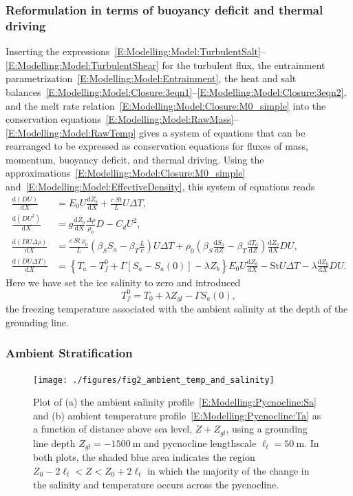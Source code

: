 \documentclass[openacc]{rsproca_new}%
\newcommand{\dd}[2]{\frac{\mathrm{d} #1}{\mathrm{d} #2}}
\begin{document}
\subsubsection{Reformulation in terms of buoyancy deficit and thermal driving}
Inserting the expressions~\eqref{E:Modelling:Model:TurbulentSalt}--\eqref{E:Modelling:Model:TurbulentShear} for the turbulent flux, the entrainment parametrization~\eqref{E:Modelling:Model:Entrainment}, the heat and salt balances~\eqref{E:Modelling:Model:Closure:3eqn1}--\eqref{E:Modelling:Model:Closure:3eqn2}, and the melt rate relation~\eqref{E:Modelling:Model:Closure:M0_simple} into the conservation equations~\eqref{E:Modelling:Model:RawMass}--\eqref{E:Modelling:Model:RawTemp} gives a system of equations that can be rearranged to be expressed as conservation equations for fluxes of mass, momentum, buoyancy deficit, and thermal driving. Using the approximations~\eqref{E:Modelling:Model:Closure:M0_simple} and~\eqref{E:Modelling:Model:EffectiveDensity}, this system of equations reads
\begin{align}
\dd{(DU)}{X} &= E_0 U \dd{Z_b}{X}+ \frac{c~\textit{St}}{L}U\Delta T,\label{E:Modelling:Model:Mass}\\
\dd{(DU^2)}{X} &= g \dd{Z_b}{X} \frac{\Delta \rho }{\rho_0} D - C_d U^2, \label{E:Modelling:Model:Mom}\\
\dd{(DU\Delta \rho)}{X} &= \frac{c~\textit{St}~\rho_0}{L}\left(\beta_S S_a - \beta_T \frac{L}{c}\right) U\Delta T + \rho_0\left(\beta_S \dd{S_a}{Z}-\beta_T \dd{T_a}{Z}\right) \dd{Z_b}{X} DU, \label{E:Modelling:Model:Buoyancy}\\
\dd{(DU\Delta T)}{X} &= \left\{T_a - T_{f}^0 + \Gamma \left[S_a - S_a(0)\right] - \lambda Z_b\right\}E_0 U \dd{Z_b}{X} - \mathrm{St}U \Delta T - \lambda \dd{Z_b}{X} DU.
\label{E:Modelling:Model:Thermal}
\end{align}
Here we have set the ice salinity to zero and introduced
\begin{equation}
T_{f}^0 = T_0 + \lambda Z_{gl} - \Gamma S_a(0),
\end{equation}
the freezing temperature associated with the ambient salinity at the depth of the grounding line.

\subsubsection{Ambient Stratification}\label{S:Model:Pycnocline}
\begin{figure}
\centering
\texttt{[image: ./figures/fig2\_ambient\_temp\_and\_salinity]}
\caption{Plot of (a) the ambient salinity profile~\eqref{E:Modelling:Pycnocline:Sa} and (b) ambient temperature profile~\eqref{E:Modelling:Pycnocline:Ta} as a function of distance above sea level, $Z + Z_{gl}$, using a grounding line depth $Z_{gl} = -1500~\si{\meter}$ and pycnocline lengthscale $\ell_t = 50~\si{\meter}$. In both plots, the shaded blue area indicates the region $Z_0 - 2\ell_t < Z < Z_0 + 2\ell_t$ in which the majority of the change in the salinity and temperature occurs across the pycnocline.}\label{fig:Pycnocline_Profiles}
\end{figure}
\end{document}
